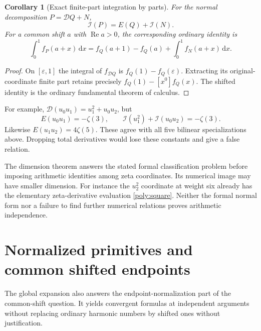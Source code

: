 \documentclass[11pt,a4paper]{article}
\numberwithin{equation}{section}
\newtheorem{corollary}[theorem]{Corollary}
\theoremstyle{definition}
\theoremstyle{remark}
\DeclareMathOperator{\re}{Re}
\newcommand{\dd}{\,\mathrm d}
\newcommand{\cI}{\mathcal I}
\newcommand{\cD}{\mathcal D}
\begin{document}
\begin{corollary}[Exact finite-part integration by parts]
\label{poly:endpointcor}
For the normal decomposition $P=\cD Q+N$,
\begin{equation}\label{poly:IBPintegral}
 \boxed{\cI(P)=E(Q)+\cI(N).}
\end{equation}
For a common shift $a$ with $\re a>0$, the corresponding ordinary
identity is
\begin{equation}\label{poly:IBPshift}
 \int_0^1f_P(a+x)\dd x
 =f_Q(a+1)-f_Q(a)+\int_0^1f_N(a+x)\dd x.
\end{equation}
\end{corollary}
\begin{proof}
On $[\varepsilon,1]$ the integral of $f_{\cD Q}$ is
$f_Q(1)-f_Q(\varepsilon)$. Extracting its original-coordinate
finite part retains precisely $f_Q(1)-[x^0]f_Q(x)$.
The shifted identity is the ordinary fundamental theorem of calculus.
\end{proof}

For example, $\cD(u_0u_1)=u_1^2+u_0u_2$, but
\begin{equation}\label{poly:boundaryexample}
 E(u_0u_1)=-\zeta(3),\qquad
 \cI(u_1^2)+\cI(u_0u_2)=-\zeta(3).
\end{equation}
Likewise $E(u_1u_2)=4\zeta(5)$. These agree with all five bilinear
specializations above. Dropping total derivatives would lose these
constants and give a false relation.

The dimension theorem answers the stated formal classification problem
before imposing arithmetic identities among zeta coordinates.
Its numerical image may have smaller dimension. For instance the
$u_2^2$ coordinate at weight six already has the elementary zeta-derivative
evaluation \eqref{poly:square}. Neither the formal normal form nor a
failure to find further numerical relations proves arithmetic independence.



\section{Normalized primitives and common shifted endpoints}
\label{poly:primitives}

The global expansion also answers the endpoint-normalization part of
the common-shift question. It yields convergent formulas at independent
arguments without replacing ordinary harmonic numbers by shifted ones
without justification.
\end{document}
